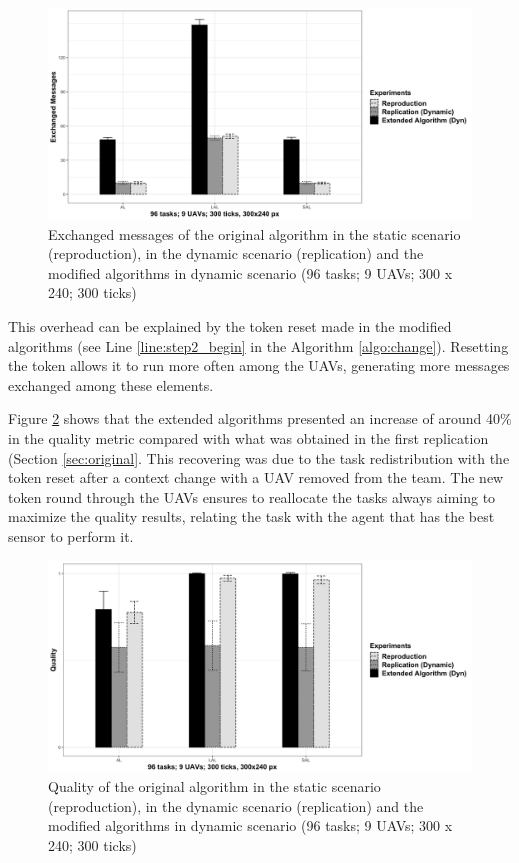 \begin{figure}[h!]
	\begin{center}
		\includegraphics[scale=0.15]{fig/GRAPH06.png}
		\caption{Exchanged messages  of the original algorithm in the static scenario (reproduction), in the dynamic scenario (replication) and the modified algorithms in dynamic scenario (96 tasks; 9 UAVs; 300 x 240; 300 ticks)}
		\label{fig:fig06}
	\end{center}
\end{figure}

This overhead can be explained by the token reset made in the modified algorithms (see Line \ref{line:step2_begin} in the Algorithm \ref{algo:change}). Resetting the token allows it to run more often among the UAVs, generating more messages exchanged among these elements.

Figure \ref{fig:fig05} shows that the extended algorithms presented an increase of around 40\% in the quality metric compared with what was obtained in the first replication (Section \ref{sec:original}. This recovering was due to the task redistribution with the token reset after a context change with a UAV removed from the team. The new token round through the UAVs ensures to reallocate the tasks always aiming to maximize the quality results, relating the task with the agent that has the best sensor to perform it.

\begin{figure}[h!]
	\begin{center}
		\includegraphics[scale=0.15]{fig/GRAPH07.png}
		\caption{Quality of the original algorithm in the static scenario (reproduction), in the dynamic scenario (replication) and the modified algorithms in dynamic scenario (96 tasks; 9 UAVs; 300 x 240; 300 ticks)}
		\label{fig:fig05}
	\end{center}
\end{figure}

